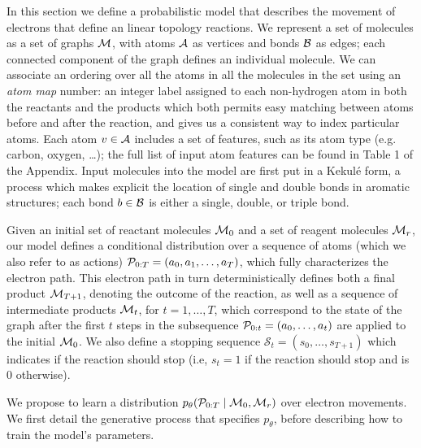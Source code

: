 


In this section we define a probabilistic model that describes the movement of electrons that define an linear topology reactions.
We represent a set of molecules as a set of graphs ${\mathcal{M}}$, with atoms ${\mathcal{A}}$ as vertices and bonds ${\mathcal{B}}$ as edges;
each connected component of the graph defines an individual molecule.
We can associate an ordering over all the atoms in all the molecules in the set using an {\em atom map} number:
an integer label assigned to each non-hydrogen atom in both the reactants and the products which 
both permits easy matching between atoms before and after the reaction, and
gives us a consistent way to index particular atoms.
Each atom $v \in {\mathcal{A}}$ includes a set of features, such as its atom type (e.g. carbon, oxygen, \dots); the full list of input atom features can be found in Table 1 of the Appendix.
Input molecules into the model are first put in a Kekul\'e form, a process which makes explicit the location of single and double bonds in aromatic structures;
each bond $b \in {\mathcal{B}}$ is either a single, double, or triple bond.


Given an initial set of reactant molecules ${\mathcal{M}}_0$ and a set of reagent molecules ${\mathcal{M}}_r$, 
our model defines a conditional distribution over a sequence of atoms (which we also refer to as actions) ${\mathcal{P}}_{0:T} = (a_0, a_1, \ldots, a_T)$,
which fully characterizes the electron path.
This electron path in turn deterministically defines both a final product ${\mathcal{M}}_{T+1}$, 
denoting the outcome of the reaction,
as well as a sequence of intermediate products ${\mathcal{M}}_t$, for $t = 1,\dots,T$,
which correspond to the state of the graph after the first $t$ steps in the subsequence ${\mathcal{P}}_{0:t} = (a_0, \dots, a_t)$ are applied to the initial ${\mathcal{M}}_0$. We also define a stopping sequence $\mathcal{S}_t = (s_0, \ldots, s_{T+1})$ which indicates if the reaction should stop (i.e, $s_t\!=\!1$ if the reaction should stop and is $0$ otherwise). 

We propose to learn a distribution $p_\theta( {\mathcal{P}}_{0:T} \mid {\mathcal{M}}_0, {\mathcal{M}}_r)$ over electron movements. 
We first detail the generative process %
that specifies $p_\theta$, before describing how to train the model's parameters.


